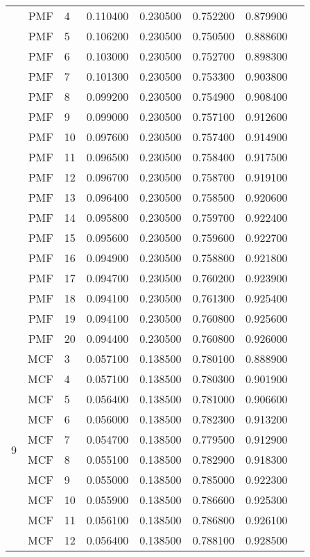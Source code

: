 \documentclass[a4paper,12pt]{article}
\begin{document}
\begin{center}
\begin{longtable}{lrlrrrrr}
& PMF & 4 & 0.110400 & 0.230500 & 0.752200 & 0.879900 \\
& PMF & 5 & 0.106200 & 0.230500 & 0.750500 & 0.888600 \\
& PMF & 6 & 0.103000 & 0.230500 & 0.752700 & 0.898300 \\
& PMF & 7 & 0.101300 & 0.230500 & 0.753300 & 0.903800 \\
& PMF & 8 & 0.099200 & 0.230500 & 0.754900 & 0.908400 \\
& PMF & 9 & 0.099000 & 0.230500 & 0.757100 & 0.912600 \\
& PMF & 10 & 0.097600 & 0.230500 & 0.757400 & 0.914900 \\
& PMF & 11 & 0.096500 & 0.230500 & 0.758400 & 0.917500 \\
& PMF & 12 & 0.096700 & 0.230500 & 0.758700 & 0.919100 \\
& PMF & 13 & 0.096400 & 0.230500 & 0.758500 & 0.920600 \\
& PMF & 14 & 0.095800 & 0.230500 & 0.759700 & 0.922400 \\
& PMF & 15 & 0.095600 & 0.230500 & 0.759600 & 0.922700 \\
& PMF & 16 & 0.094900 & 0.230500 & 0.758800 & 0.921800 \\
& PMF & 17 & 0.094700 & 0.230500 & 0.760200 & 0.923900 \\
& PMF & 18 & 0.094100 & 0.230500 & 0.761300 & 0.925400 \\
& PMF & 19 & 0.094100 & 0.230500 & 0.760800 & 0.925600 \\
& PMF & 20 & 0.094400 & 0.230500 & 0.760800 & 0.926000 \\ \hline
\multirow{18}{1cm}{9} & MCF & 3 & 0.057100 & 0.138500 & 0.780100 & 0.888900 \\
& MCF & 4 & 0.057100 & 0.138500 & 0.780300 & 0.901900 \\
& MCF & 5 & 0.056400 & 0.138500 & 0.781000 & 0.906600 \\
& MCF & 6 & 0.056000 & 0.138500 & 0.782300 & 0.913200 \\
& MCF & 7 & 0.054700 & 0.138500 & 0.779500 & 0.912900 \\
& MCF & 8 & 0.055100 & 0.138500 & 0.782900 & 0.918300 \\
& MCF & 9 & 0.055000 & 0.138500 & 0.785000 & 0.922300 \\
& MCF & 10 & 0.055900 & 0.138500 & 0.786600 & 0.925300 \\
& MCF & 11 & 0.056100 & 0.138500 & 0.786800 & 0.926100 \\
& MCF & 12 & 0.056400 & 0.138500 & 0.788100 & 0.928500 \\

\end{longtable}
\end{center}
\end{document}
